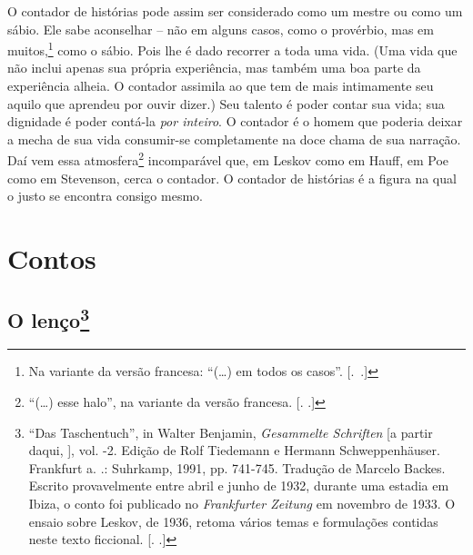 O contador de histórias pode assim ser considerado como um mestre ou
como um sábio. Ele sabe aconselhar -- não em alguns casos, como o
provérbio, mas em muitos,\footnote{Na variante da versão francesa: ``(\ldots{}) em
  todos os casos''. [.~.]} como o sábio. Pois lhe é dado
recorrer a toda uma vida. (Uma vida que não inclui apenas sua própria
experiência, mas também uma boa parte da experiência alheia. O contador
assimila ao que tem de mais intimamente seu aquilo que aprendeu por
ouvir dizer.) Seu talento é poder contar sua vida; sua dignidade é poder
contá-la \emph{por inteiro}. O contador é o homem que poderia deixar a
mecha de sua vida consumir-se completamente na doce chama de sua
narração. Daí vem essa atmosfera\footnote{``(\ldots{}) esse halo'', na variante da
  versão francesa. [. .]} incomparável que, em Leskov como em
Hauff, em Poe como em Stevenson, cerca o contador. O contador de
histórias é a figura na qual o justo se encontra consigo mesmo\label{supra4}.

\part{Contos}

\chapter{O lenço\footnote[*]{``Das Taschentuch'', in Walter Benjamin,
  \emph{Gesammelte Schriften} [a partir daqui, ], vol. -2.
  Edição de Rolf Tiedemann e Hermann Schweppenhäuser. Frankfurt a. .:
  Suhrkamp, 1991, pp. 741-745. Tradução de Marcelo Backes. Escrito
  provavelmente entre abril e junho de 1932, durante uma estadia em
  Ibiza, o conto foi publicado no \emph{Frankfurter Zeitung} em novembro
  de 1933. O ensaio sobre Leskov, de 1936, retoma vários temas e
  formulações contidas neste texto ficcional. [. .]}}

